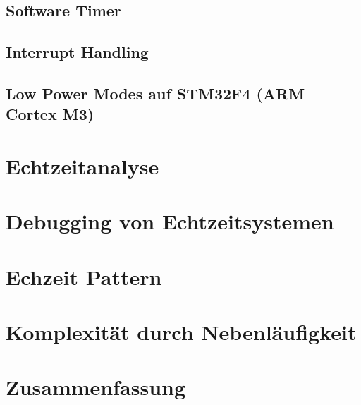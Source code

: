 \documentclass[ngerman]{seminarvorlage}
\begin{document}
\subsection{Software Timer}
\subsection{Interrupt Handling}
\subsection{Low Power Modes auf STM32F4 (ARM Cortex M3)}
\label{sec:Low Power Modes} 
\section{Echtzeitanalyse}
\label{sec:Echtzeitanalyse} 
\section{Debugging von Echtzeitsystemen} 
\section{Echzeit Pattern} 
\section{Komplexität durch Nebenläufigkeit} 
\section{Zusammenfassung}
\pagebreak

\end{document}
